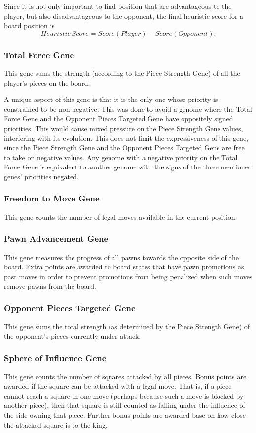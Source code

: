 \documentclass[letter]{article}
\renewcommand\_{\textunderscore\allowbreak}
\begin{document}
Since it is not only important to find position that are advantageous to the player, but also disadvantageous to the opponent, the final heuristic score for a board position is
$$Heuristic\ Score = Score(Player) - Score(Opponent).$$

\subsubsection{Total Force Gene}
\label{total-force}
This gene sums the strength (according to the Piece Strength Gene) of all the player's pieces on the board.

A unique aspect of this gene is that it is the only one whose priority is constrained to be non-negative. This was done to avoid a genome where the Total Force Gene and the Opponent Pieces Targeted Gene have oppositely signed priorities. This would cause mixed pressure on the Piece Strength Gene values, interfering with its evolution. This does not limit the expressiveness of this gene, since the Piece Strength Gene and the Opponent Pieces Targeted Gene are free to take on negative values. Any genome with a negative priority on the Total Force Gene is equivalent to another genome with the signs of the three mentioned genes' priorities negated.

\subsubsection{Freedom to Move Gene}
This gene counts the number of legal moves available in the current position.

\subsubsection{Pawn Advancement Gene}
This gene measures the progress of all pawns towards the opposite side of the board. Extra points are awarded to board states that have pawn promotions as past moves in order to prevent promotions from being penalized when such moves remove pawns from the board.

\subsubsection{Opponent Pieces Targeted Gene}
This gene sums the total strength (as determined by the Piece Strength Gene) of the opponent's pieces currently under attack.

\subsubsection{Sphere of Influence Gene}
This gene counts the number of squares attacked by all pieces. Bonus points are awarded if the square can be attacked with a legal move. That is, if a piece cannot reach a square in one move (perhaps because such a move is blocked by another piece), then that square is still counted as falling under the influence of the side owning that piece. Further bonus points are awarded base on how close the attacked square is to the king.
\end{document}
